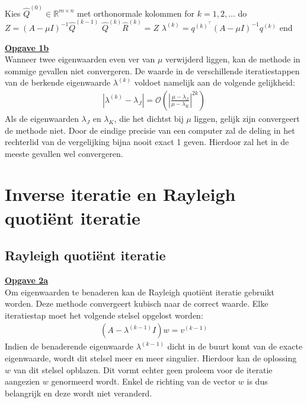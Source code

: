 \documentclass[a4paper, 12pt, titlepage, fleqn]{article}
\begin{document}
\begin{algorithm}[caption={Gelijktijdige iteratie}, label={alg:gelijktijdige iteratie}]
Kies $\hat{Q}^{(0)} \in \mathbb{R}^{m\times n}$ met orthonormale kolommen
for $k = 1,2,\ldots$ do
	$Z = (A-\mu I)^{-1}\hat{Q}^{(k-1)}$
	$\hat{Q}^{(k)}\hat{R}^{(k)} = Z$
	$\lambda^{(k)} = q^{(k)^\intercal}(A -\mu I)^{-1}q^{(k)}$
end
\end{algorithm}

\underline{\textbf{Opgave 1b}}\\

Wanneer twee eigenwaarden even ver van $\mu$ verwijderd liggen, kan de methode in sommige gevallen niet convergeren. De waarde in de verschillende iteratiestappen van de berkende eigenwaarde $\lambda^{(k)}$ voldoet namelijk aan de volgende gelijkheid:
\begin{align*}
|\lambda^{(k)} - \lambda_J| = \mathcal{O}\left(\left|\frac{\mu - \lambda_J}{\mu - \lambda_K}\right|^{2k}\right)
\end{align*} 
Als de eigenwaarden $\lambda_J$ en $\lambda_K$, die het dichtst bij $\mu$ liggen, gelijk zijn convergeert de methode niet. Door de eindige precisie van een computer zal de deling in het rechterlid van de vergelijking bijna nooit exact 1 geven. Hierdoor zal het in de meeste gevallen wel convergeren.

\section{Inverse iteratie en Rayleigh quoti\"ent iteratie}\label{sec:inverse iteratie}
\subsection{Rayleigh quoti\"ent iteratie}
\underline{\textbf{Opgave 2a}}\\

Om eigenwaarden te benaderen kan de Rayleigh quoti\"ent iteratie gebruikt worden. Deze methode convergeert kubisch naar de correct waarde. Elke iteratiestap moet het volgende stelsel opgelost worden:
\begin{align*}
(A - \lambda^{(k-1)}I)w = v^{(k-1)}
\end{align*}
Indien de benaderende eigenwaarde $\lambda^{(k-1)}$ dicht in de buurt komt van de exacte eigenwaarde, wordt dit stelsel meer en meer singulier. Hierdoor kan de oplossing $w$ van dit stelsel opblazen. Dit vormt echter geen proleem voor de iteratie aangezien $w$ genormeerd wordt. Enkel de richting van de vector $w$ is dus belangrijk en deze wordt niet veranderd.\\
\end{document}
